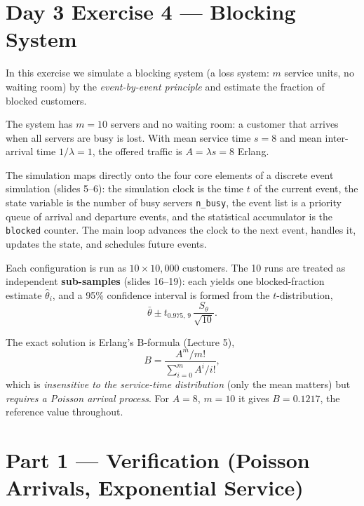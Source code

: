 \newpage
\section*{Day 3 Exercise 4 --- Blocking System }

In this exercise we simulate a blocking system (a loss system: $m$ service units, no waiting
room) by the \emph{event-by-event principle} and estimate the fraction of
blocked customers. 


The system has $m = 10$ servers and no waiting room: a customer that arrives
when all servers are busy is lost. With mean service time $s = 8$ and mean
inter-arrival time $1/\lambda = 1$, the offered traffic is $A = \lambda s = 8$
Erlang.

The simulation maps directly onto the four core elements of a discrete event
simulation (slides 5--6): the simulation clock is the time $t$ of the current
event, the state variable is the number of busy servers \texttt{n\_busy}, the
event list is a priority queue of arrival and departure events, and the
statistical accumulator is the \texttt{blocked} counter. The main loop advances
the clock to the next event, handles it, updates the state, and schedules
future events.

Each configuration is run as $10 \times 10{,}000$ customers. The 10 runs are
treated as independent \textbf{sub-samples} (slides 16--19): each yields one
blocked-fraction estimate $\hat\theta_i$, and a 95\% confidence interval is
formed from the $t$-distribution,
\begin{equation}
    \bar\theta \pm t_{0.975,\,9}\, \frac{S_\theta}{\sqrt{10}}.
    \label{eq:ci}
\end{equation}

The exact solution is Erlang's B-formula (Lecture 5),
\begin{equation}
    B = \frac{A^m / m!}{\sum_{i=0}^{m} A^i / i!},
    \label{eq:erlangb}
\end{equation}
which is \emph{insensitive to the service-time distribution} (only the mean
matters) but \emph{requires a Poisson arrival process}. For $A = 8$, $m = 10$
it gives $B = 0.1217$, the reference value throughout.

\section*{Part 1 --- Verification (Poisson Arrivals, Exponential Service)}

